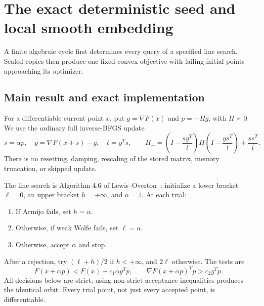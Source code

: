 \chapter{The exact deterministic seed and local smooth embedding}\label{comp:D}\label{D:chapter}
\renewcommand{\ModuleTag}{12}
A finite algebraic cycle first determines every query of a specified line search. Scaled copies then produce one fixed convex objective with failing initial points approaching its optimizer.


\begingroup
\providecommand{\R}{}
\renewcommand{\R}{\mathbb R}
\providecommand{\B}{}
\renewcommand{\B}{\mathcal B}
\providecommand{\I}{}
\renewcommand{\I}{I}
\setcounter{section}{0}
\setcounter{theorem}{0}
\setcounter{lemma}{0}
\setcounter{corollary}{0}
\setcounter{proposition}{0}
\setcounter{remark}{0}
\setcounter{equation}{0}


\section{Main result and exact implementation}

For a differentiable current point $x$, put $g=\nabla F(x)$ and $p=-Hg$, with $H\succ0$. We use the ordinary full inverse-BFGS update
\begin{equation}\label{D:bfgs}
 s=\alpha p,\quad y=\nabla F(x+s)-g,\quad t=y^Ts,\qquad
 H_+=\left(I-\frac{sy^T}{t}\right)H\left(I-\frac{ys^T}{t}\right)+\frac{ss^T}{t}.
\end{equation}
There is no resetting, damping, rescaling of the stored matrix, memory truncation, or skipped update.

The line search is Algorithm 4.6 of Lewis--Overton~\cite{LO}: initialize a lower bracket $\ell=0$, an upper bracket $h=+\infty$, and $\alpha=1$. At each trial:
\begin{enumerate}
\item If Armijo fails, set $h=\alpha$.
\item Otherwise, if weak Wolfe fails, set $\ell=\alpha$.
\item Otherwise, accept $\alpha$ and stop.
\end{enumerate}
After a rejection, try $(\ell+h)/2$ if $h<+\infty$, and $2\ell$ otherwise. The tests are
\[
 F(x+\alpha p)<F(x)+c_1\alpha g^Tp,
 \qquad \nabla F(x+\alpha p)^Tp>c_2g^Tp.
\]
All decisions below are strict; using non-strict acceptance inequalities produces the identical orbit. Every trial point, not just every accepted point, is differentiable.

